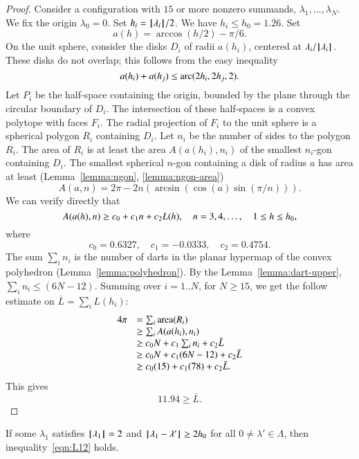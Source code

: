 \begin{proof} 
Consider a configuration with $15$ or more nonzero summands, $\lambda_1,\ldots,\lambda_N$. 
We fix the origin $\lambda_0=0$.  Set $h_i = {{\hskip0.1em|\hskip-0.15em|\hskip0.1em}\lambda_i{\hskip0.1em|\hskip-0.15em|\hskip0.1em}}/2$.  We have $h_i\le h_0=1.26$.  Set
$$
a(h) = \arccos(h/2) - \pi/6.
$$
On the unit sphere,  consider the disks $D_i$ of radii $a(h_i)$, centered at $\lambda_i/{{\hskip0.1em|\hskip-0.15em|\hskip0.1em}\lambda_i{\hskip0.1em|\hskip-0.15em|\hskip0.1em}}$.  These disks do not overlap; this follows from the easy inequality~\cite[cc:disks]{hales:2009:nonlinear} %
$$
a(h_i) + a(h_j) \le {\operatorname{arc}}(2h_i,2h_j,2).
$$
Let $P_i$ be the half-space containing the origin, bounded by the plane through the circular boundary of $D_i$.  The intersection of these half-spaces is a convex polytope with faces $F_i$.  The radial projection of $F_i$ to the unit sphere is a spherical polygon $R_i$ containing $D_i$.  Let $n_i$ be the number of sides to the polygon $R_i$.  The area of $R_i$ is at least the area $A(a(h_i),n_i)$ of the smallest $n_i$-gon containing $D_i$.  The smallest spherical $n$-gon containing a disk of radius $a$ has area at least (Lemma~\ref{lemma:ngon}, \ref{lemma:ngon-area})
$$
A(a,n) = 2\pi - 2 n (\arcsin(\cos(a)\sin(\pi/n))).
$$
We can verify directly that~\cite[cc:alin]{hales:2009:nonlinear} %
$$
A(a(h),n) \ge c_0 + c_1 n + c_2 L(h),\quad
n = 3,4,\ldots,\quad 1\le h\le {h_0},
$$
where
$$c_0 = 0.6327,\quad c_1 = -0.0333,\quad c_2 = 0.4754.$$
The sum $\sum_i n_i$ is the number of darts in the planar hypermap of
the convex polyhedron (Lemma~\ref{lemma:polyhedron}).  By the Lemma~\ref{lemma:dart-upper}, 
$\sum_i n_i \le (6N-12)$.
Summing over $i=1..N$, for $N\ge 15$, we get the follow
estimate on $\bar L = \sum_i L(h_i)$:
$$
\begin{array}{lll}
4\pi &= \sum_i{\operatorname{area}}(R_i)\\
     &\ge \sum_i A(a(h_i),n_i) \\
     &\ge c_0 N +c_1\sum_i n_i + c_2 \bar L\\
     &\ge c_0 N +c_1 (6N-12) + c_2 \bar L\\
     &\ge c_0 (15) +c_1 (78) + c_2 \bar L.\\
\end{array}
$$
This gives
$$
11.94 \ge \bar L. 
$$
\end{proof} 


\begin{lemma}\label{lemma:D'}  
If some $\lambda_1$ satisfies ${{\hskip0.1em|\hskip-0.15em|\hskip0.1em}\lambda_1{\hskip0.1em|\hskip-0.15em|\hskip0.1em}}=2$ and
${\hskip0.1em|\hskip-0.15em|\hskip0.1em}\lambda_1 - \lambda'{\hskip0.1em|\hskip-0.15em|\hskip0.1em}\ge 2{h_0}$ for all $0\ne\lambda'\in\Lambda$,
then  inequality~\ref{eqn:L12} holds.
\end{lemma}

